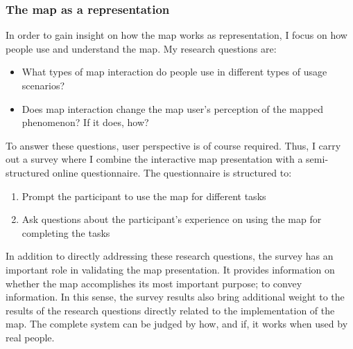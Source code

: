 
\subsubsection{The map as a representation}

In order to gain insight on how the map works as representation,
I focus on how people use and understand the map.
My research questions are:  %

\begin{itemize}
	\item What types of map interaction do people use
	in different types of usage scenarios?
	\item Does map interaction change
	the map user's perception of the mapped phenomenon? If it does, how?
\end{itemize}

To answer these questions, user perspective is of course required.
Thus, I carry out a survey
where I combine the interactive map presentation with
a semi-structured online questionnaire.
The questionnaire is structured to:
\begin{enumerate}
	\item Prompt the participant to use the map for different tasks
	\item Ask questions about the participant's experience
	on using the map for completing the tasks
\end{enumerate}

In addition to directly addressing these research questions,
the survey has an important role in validating the map presentation.
It provides information on
whether the map accomplishes its most important purpose;
to convey information.
In this sense,
the survey results also bring additional weight to
the results of the research questions
directly related to the implementation of the map.
The complete system can be judged by
how, and if, it works when used by real people.



